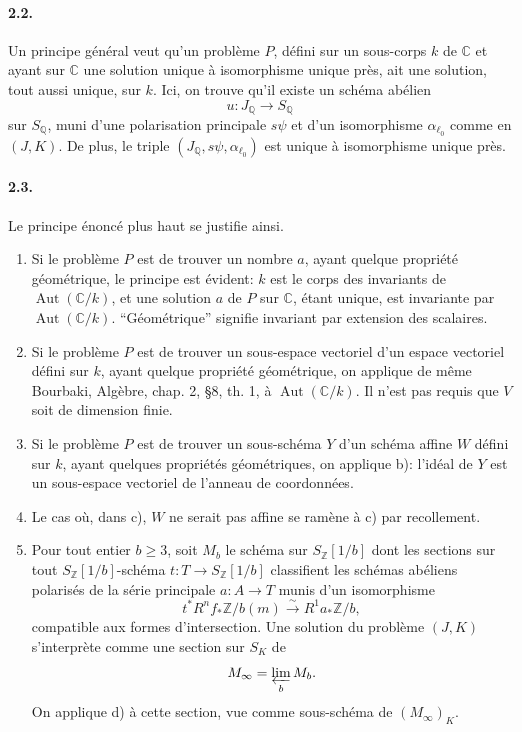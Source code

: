 \documentclass[10pt]{article}
\newcommand{\C}{\mathbb C}
\newcommand{\Q}{\mathbb Q}
\newcommand{\Z}{\mathbb Z}
\newcommand{\Aut}{\operatorname{Aut}}
\newcommand{\iso}{\xrightarrow{\sim}}
\begin{document}
\paragraph{2.2.} Un principe général veut qu'un problème \(P\), défini sur un sous-corps \(k\) de \(\C\) et ayant sur \(\C\) une solution unique à isomorphisme unique près, ait une solution, tout aussi unique, sur \(k\). Ici, on trouve qu'il existe un schéma abélien
\[
u:J_\Q\to S_\Q
\]
sur \(S_\Q\), muni d'une polarisation principale \(s\psi\) et d'un isomorphisme \(\alpha_{\ell_0}\) comme en \((J,K)\). De plus, le triple \((J_\Q,s\psi,\alpha_{\ell_0})\) est unique à isomorphisme unique près.

\paragraph{2.3.} Le principe énoncé plus haut se justifie ainsi.
\begin{enumerate}[label=\alph*)]
\item Si le problème \(P\) est de trouver un nombre \(a\), ayant quelque propriété géométrique, le principe est évident: \(k\) est le corps des invariants de \(\Aut(\C/k)\), et une solution \(a\) de \(P\) sur \(\C\), étant unique, est invariante par \(\Aut(\C/k)\). ``Géométrique'' signifie invariant par extension des scalaires.
\item Si le problème \(P\) est de trouver un sous-espace vectoriel d'un espace vectoriel défini sur \(k\), ayant quelque propriété géométrique, on applique de même Bourbaki, Algèbre, chap. 2, §8, th. 1, à \(\Aut(\C/k)\). Il n'est pas requis que \(V\) soit de dimension finie.
\item Si le problème \(P\) est de trouver un sous-schéma \(Y\) d'un schéma affine \(W\) défini sur \(k\), ayant quelques propriétés géométriques, on applique b): l'idéal de \(Y\) est un sous-espace vectoriel de l'anneau de coordonnées.
\item Le cas où, dans c), \(W\) ne serait pas affine se ramène à c) par recollement.
\item Pour tout entier \(b\ge3\), soit \(M_b\) le schéma sur \(S_\Z[1/b]\) dont les sections sur tout \(S_\Z[1/b]\)-schéma \(t:T\to S_\Z[1/b]\) classifient les schémas abéliens polarisés de la série principale \(a:A\to T\) munis d'un isomorphisme
\[
t^*R^nf_*\Z/b(m)\iso R^1a_*\Z/b,
\]
compatible aux formes d'intersection. Une solution du problème \((J,K)\) s'interprète comme une section sur \(S_K\) de
\[
M_\infty=\varprojlim_b M_b.
\]
On applique d) à cette section, vue comme sous-schéma de \((M_\infty)_K\).
\end{enumerate}
\end{document}
